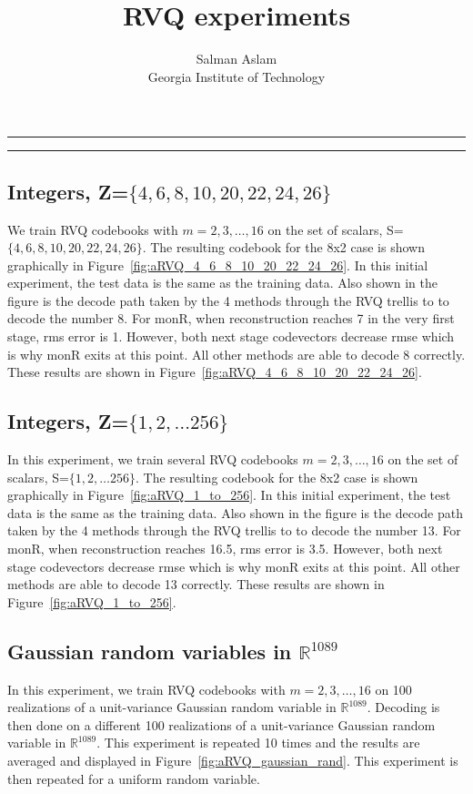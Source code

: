 
\title{RVQ experiments}
\author{Salman Aslam\\ Georgia Institute of Technology}
\date{}


\maketitle
\rule[0pt]{\textwidth}{1pt}
\tableofcontents
\rule[0pt]{\textwidth}{1pt}

\subsection{Integers, Z=$\{4, 6, 8, 10, 20, 22, 24, 26\}$}
We train RVQ codebooks with $m=2, 3, \ldots, 16$ on the set of scalars, S=$\{4, 6, 8, 10, 20, 22, 24, 26\}$.  The resulting codebook for the 8x2 case is shown graphically in Figure~\ref{fig:aRVQ_4_6_8_10_20_22_24_26}.  In this initial experiment, the test data is the same as the training data.  Also shown in the figure is the decode path taken by the 4 methods through the RVQ trellis to to decode the number 8.  For monR, when reconstruction reaches 7 in the very first stage, rms error is 1.  However, both next stage codevectors decrease rmse which is why monR exits at this point.  All other methods are able to decode 8 correctly.  These results are shown in Figure~\ref{fig:aRVQ_4_6_8_10_20_22_24_26}.  
  
 
\subsection{Integers, Z=$\{1, 2, \ldots 256\}$}
In this experiment, we train several RVQ codebooks $m=2, 3, \ldots, 16$ on the set of scalars, S=$\{1, 2, \ldots 256\}$.  The resulting codebook for the 8x2 case is shown graphically in Figure~\ref{fig:aRVQ_1_to_256}.  In this initial experiment, the test data is the same as the training data.  Also shown in the figure is the decode path taken by the 4 methods through the RVQ trellis to to decode the number 13.  For monR, when reconstruction reaches 16.5, rms error is 3.5.  However, both next stage codevectors decrease rmse which is why monR exits at this point.  All other methods are able to decode 13 correctly.   These results are shown in Figure~\ref{fig:aRVQ_1_to_256}. 

\subsection{Gaussian random variables in $\mathbb{R}^{1089}$}
In this experiment, we train RVQ codebooks with $m=2, 3, \ldots, 16$ on 100 realizations of a unit-variance Gaussian random variable in $\mathbb{R}^{1089}$.  Decoding is then done on a different 100 realizations of a unit-variance Gaussian random variable in $\mathbb{R}^{1089}$.  This experiment is repeated 10 times and the results are averaged and displayed in Figure~\ref{fig:aRVQ_gaussian_rand}.  This experiment is then repeated for a uniform random variable. 

